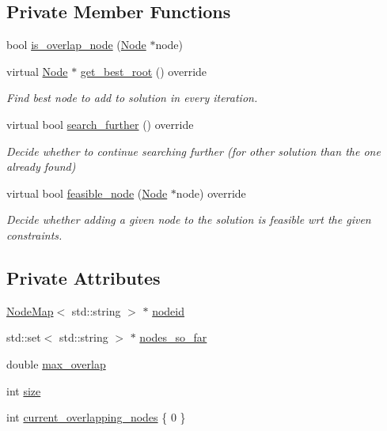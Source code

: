 \subsection*{Private Member Functions}
\begin{DoxyCompactItemize}
\item 
bool \hyperlink{classderegnet_1_1SuboptimalStartHeuristic_a911e7e3003bbf92b170a943e714b014e}{is\+\_\+overlap\+\_\+node} (\hyperlink{namespacederegnet_a744bad34f2de9856d36715a445f027f3}{Node} $\ast$node)
\item 
virtual \hyperlink{namespacederegnet_a744bad34f2de9856d36715a445f027f3}{Node} $\ast$ \hyperlink{classderegnet_1_1SuboptimalStartHeuristic_aaa8bad0a658a0e1de5e849a5fb58aa21}{get\+\_\+best\+\_\+root} () override
\begin{DoxyCompactList}\small\item\em Find best node to add to solution in every iteration. \end{DoxyCompactList}\item 
virtual bool \hyperlink{classderegnet_1_1SuboptimalStartHeuristic_afe38bb6e18c6fb1270537bab0d2a3158}{search\+\_\+further} () override
\begin{DoxyCompactList}\small\item\em Decide whether to continue searching further (for other solution than the one already found) \end{DoxyCompactList}\item 
virtual bool \hyperlink{classderegnet_1_1SuboptimalStartHeuristic_acbd151d7620495d80be8c63f1d3c4ecb}{feasible\+\_\+node} (\hyperlink{namespacederegnet_a744bad34f2de9856d36715a445f027f3}{Node} $\ast$node) override
\begin{DoxyCompactList}\small\item\em Decide whether adding a given node to the solution is feasible wrt the given constraints. \end{DoxyCompactList}\end{DoxyCompactItemize}
\subsection*{Private Attributes}
\begin{DoxyCompactItemize}
\item 
\hyperlink{namespacederegnet_ae102b707ae1d6f83c639ece5e0dd5658}{Node\+Map}$<$ std\+::string $>$ $\ast$ \hyperlink{classderegnet_1_1SuboptimalStartHeuristic_a8928f9630eb2ffbd557e95b62c278103}{nodeid}
\item 
std\+::set$<$ std\+::string $>$ $\ast$ \hyperlink{classderegnet_1_1SuboptimalStartHeuristic_af9a38b598d55b9a1fa22b9f0c141218b}{nodes\+\_\+so\+\_\+far}
\item 
double \hyperlink{classderegnet_1_1SuboptimalStartHeuristic_ab7da09c5dc0c3fd13e19d254319ab3ba}{max\+\_\+overlap}
\item 
int \hyperlink{classderegnet_1_1SuboptimalStartHeuristic_a8645bf64e5cd06e7c432eb7b38f3d80a}{size}
\item 
int \hyperlink{classderegnet_1_1SuboptimalStartHeuristic_a422ca9127a469117bab51ae3eb2fbdcf}{current\+\_\+overlapping\+\_\+nodes} \{ 0 \}
\end{DoxyCompactItemize}
